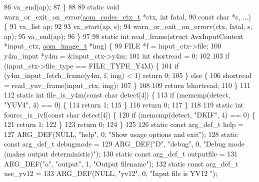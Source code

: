 \begin{DoxyCodeInclude}
{{86   va\_end(ap);
87 \}
88 
89 \textcolor{keyword}{static} \textcolor{keywordtype}{void} warn\_or\_exit\_on\_error(\hyperlink{structaom__codec__ctx}{aom\_codec\_ctx\_t} *ctx, \textcolor{keywordtype}{int} fatal,
90                                   \textcolor{keyword}{const} \textcolor{keywordtype}{char} *s, ...) \{
91   va\_list ap;
92 
93   va\_start(ap, s);
94   warn\_or\_exit\_on\_errorv(ctx, fatal, s, ap);
95   va\_end(ap);
96 \}
97 
98 \textcolor{keyword}{static} \textcolor{keywordtype}{int} read\_frame(\textcolor{keyword}{struct} AvxInputContext *input\_ctx, \hyperlink{structaom__image}{aom\_image\_t} *img) \{
99   FILE *f = input\_ctx->file;
100   y4m\_input *y4m = &input\_ctx->y4m;
101   \textcolor{keywordtype}{int} shortread = 0;
102 
103   \textcolor{keywordflow}{if} (input\_ctx->file\_type == FILE\_TYPE\_Y4M) \{
104     \textcolor{keywordflow}{if} (y4m\_input\_fetch\_frame(y4m, f, img) < 1) \textcolor{keywordflow}{return} 0;
105   \} \textcolor{keywordflow}{else} \{
106     shortread = read\_yuv\_frame(input\_ctx, img);
107   \}
108 
109   \textcolor{keywordflow}{return} !shortread;
110 \}
111 
112 \textcolor{keyword}{static} \textcolor{keywordtype}{int} file\_is\_y4m(\textcolor{keyword}{const} \textcolor{keywordtype}{char} detect[4]) \{
113   \textcolor{keywordflow}{if} (memcmp(detect, \textcolor{stringliteral}{"YUV4"}, 4) == 0) \{
114     \textcolor{keywordflow}{return} 1;
115   \}
116   \textcolor{keywordflow}{return} 0;
117 \}
118 
119 \textcolor{keyword}{static} \textcolor{keywordtype}{int} fourcc\_is\_ivf(\textcolor{keyword}{const} \textcolor{keywordtype}{char} detect[4]) \{
120   \textcolor{keywordflow}{if} (memcmp(detect, \textcolor{stringliteral}{"DKIF"}, 4) == 0) \{
121     \textcolor{keywordflow}{return} 1;
122   \}
123   \textcolor{keywordflow}{return} 0;
124 \}
125 
126 \textcolor{keyword}{static} \textcolor{keyword}{const} arg\_def\_t help =
127     ARG\_DEF(NULL, \textcolor{stringliteral}{"help"}, 0, \textcolor{stringliteral}{"Show usage options and exit"});
128 \textcolor{keyword}{static} \textcolor{keyword}{const} arg\_def\_t debugmode =
129     ARG\_DEF(\textcolor{stringliteral}{"D"}, \textcolor{stringliteral}{"debug"}, 0, \textcolor{stringliteral}{"Debug mode (makes output deterministic)"});
130 \textcolor{keyword}{static} \textcolor{keyword}{const} arg\_def\_t outputfile =
131     ARG\_DEF(\textcolor{stringliteral}{"o"}, \textcolor{stringliteral}{"output"}, 1, \textcolor{stringliteral}{"Output filename"});
132 \textcolor{keyword}{static} \textcolor{keyword}{const} arg\_def\_t use\_yv12 =
133     ARG\_DEF(NULL, \textcolor{stringliteral}{"yv12"}, 0, \textcolor{stringliteral}{"Input file is YV12 "});
}}
\end{DoxyCodeInclude}
